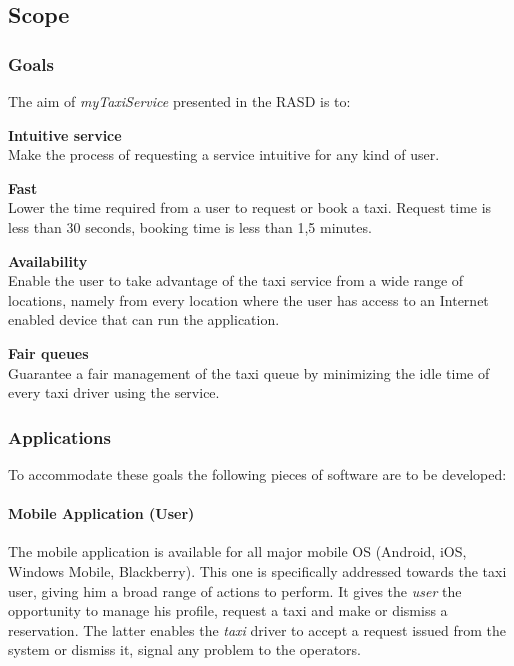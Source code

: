 \newpage

\subsection{Scope}
\label{sub:scope}
\subsubsection{Goals} %
\label{ssub:goals}
The aim of \emph{myTaxiService} presented in the RASD is to:
\begin{enumerate} [label = \textbf{[G\arabic*]}]
\item \textbf{Intuitive service}\hfill \\
\label{goal:intuitive}
Make the process of requesting a service intuitive for any kind of user.
\item \textbf{Fast}\hfill \\
\label{goal:time}
Lower the time required from a user to request or book a taxi. Request time is less than 30 seconds, booking time is less than 1,5 minutes.
\item \textbf{Availability}\hfill \\
\label{goal:availability}
Enable the user to take advantage of the taxi service from a wide range of locations, namely from every location where the user has access to an Internet enabled device that can run the application.
\item \textbf{Fair queues}\hfill \\
\label{goal:queue}
Guarantee a fair management of the taxi queue by minimizing the idle time of every taxi driver using the service.
\end{enumerate}

\subsubsection{Applications} %
\label{ssub:applications}
To accommodate these goals the following pieces of software are to be developed:

\paragraph{Mobile Application (User)} %
\label{app:mobileuser}
  The mobile application is available for all major mobile OS (Android, iOS, Windows Mobile, Blackberry).
  This one is specifically addressed towards the taxi user, giving him a broad range of actions to perform.
  It gives the \emph{user} the opportunity to manage his profile, request a taxi and make or dismiss a reservation. %
  The latter enables the \emph{taxi} driver to accept a request issued from the system or dismiss it, signal any problem to the operators.

